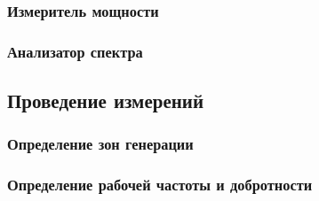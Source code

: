 \documentclass[a4paper]{article}
\begin{document}
	\subsubsection{Измеритель мощности}
	\subsubsection{Анализатор спектра}

	\subsection{Проведение измерений}
	\subsubsection{Определение зон генерации}

	\subsubsection{Определение рабочей частоты и добротности}
\end{document}
